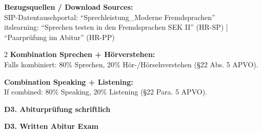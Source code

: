 \documentclass[10pt,a4paper]{article}
\newcommand{\secbil}[2]{%
\vspace{6pt}
\noindent\colorbox{spaet}{\parbox{0.48\textwidth}{\color{white}\bfseries\small #1}}%
\hfill%
\colorbox{english}{\parbox{0.48\textwidth}{\color{white}\bfseries\small #2}}
\vspace{3pt}
}
\begin{document}
\vspace{2mm}

\begin{center}
\scriptsize
\textbf{Bezugsquellen / Download Sources:}\\
SIP-Datentauschportal: ``Sprechleistung\_Moderne Fremdsprachen''\\
itslearning: ``Sprechen testen in den Fremdsprachen SEK II'' (HR-SP) | ``Paarprüfung im Abitur'' (HR-PP)
\end{center}

\vspace{2mm}

\begin{paracol}{2}
\scriptsize
\textbf{Kombination Sprechen + Hörverstehen:}\\
Falls kombiniert: 80\% Sprechen, 20\% Hör-/Hörsehverstehen (§22 Abs. 5 APVO).

\switchcolumn

\scriptsize\color{english}
\textbf{Combination Speaking + Listening:}\\
If combined: 80\% Speaking, 20\% Listening (§22 Para. 5 APVO).

\end{paracol}

\vspace{3mm}

\secbil{D3. Abiturprüfung schriftlich}{D3. Written Abitur Exam}

\vspace{2mm}
\end{document}
